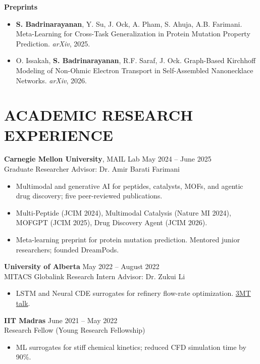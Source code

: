 \documentclass[letterpaper,10pt]{article}
\begin{document}
\noindent\textbf{Preprints}
\begin{itemize}
    \item \textbf{S. Badrinarayanan}, Y. Su, J. Ock, A. Pham, S. Ahuja, A.B. Farimani. Meta-Learning for Cross-Task Generalization in Protein Mutation Property Prediction. \textit{arXiv}, 2025.
    \item O. Issakah, \textbf{S. Badrinarayanan}, R.F. Saraf, J. Ock. Graph-Based Kirchhoff Modeling of Non-Ohmic Electron Transport in Self-Assembled Nanonecklace Networks. \textit{arXiv}, 2026.
\end{itemize}

\section*{ACADEMIC RESEARCH EXPERIENCE}
\noindent\textbf{Carnegie Mellon University}, MAIL Lab \hfill May 2024 -- June 2025\\
Graduate Researcher \hfill Advisor: Dr. Amir Barati Farimani
\begin{itemize}
    \item Multimodal and generative AI for peptides, catalysts, MOFs, and agentic drug discovery; five peer-reviewed publications.
    \item Multi-Peptide (JCIM 2024), Multimodal Catalysis (Nature MI 2024), MOFGPT (JCIM 2025), Drug Discovery Agent (JCIM 2026).
    \item Meta-learning preprint for protein mutation prediction. Mentored junior researchers; founded DreamPods.
\end{itemize}

\noindent\textbf{University of Alberta} \hfill May 2022 -- August 2022\\
MITACS Globalink Research Intern \hfill Advisor: Dr. Zukui Li
\begin{itemize}
    \item LSTM and Neural CDE surrogates for refinery flow-rate optimization. \href{https://www.youtube.com/watch?v=bidVGSq0R5o}{3MT talk}.
\end{itemize}

\noindent\textbf{IIT Madras} \hfill June 2021 -- May 2022\\
Research Fellow (Young Research Fellowship)
\begin{itemize}
    \item ML surrogates for stiff chemical kinetics; reduced CFD simulation time by 90\%.
\end{itemize}
\end{document}
